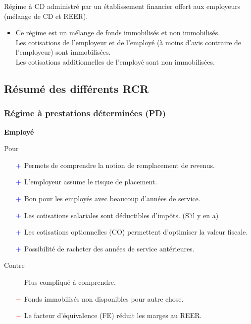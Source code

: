\documentclass[10pt, french]{article}
\begin{document}
\begin{multicols*}{3}
\begin{definitionNOHFILL}
Régime à CD administré par un établissement financier offert aux employeurs (mélange de CD et REER).

\begin{itemize}[leftmargin = *]
	\item	Ce régime est un mélange de fonds immobilisés et non immobilisés. \\
			Les cotisations de l'employeur et de l'employé (à moins d’avis contraire de l’employeur) sont immobilisées. \\
			Les cotisations additionnelles de l'employé sont non immobilisées.
\end{itemize}
\end{definitionNOHFILL}

\columnbreak

\subsection*{Résumé des différents RCR}

\subsubsection*{Régime à prestations déterminées (PD)}
\begin{center}
	\textbf{Employé}
\end{center}
Pour
\begin{itemize}
	\item[$\color{blue}+$]	Permets de comprendre la notion de remplacement de revenus.
	\item[$\color{blue}+$]	L'employeur assume le risque de placement.
	\item[$\color{blue}+$]	Bon pour les employés avec beaucoup d'années de service.
	\item[$\color{blue}+$]	Les cotisations salariales sont déductibles d'impôts. (S'il y en a)
	\item[$\color{blue}+$]	Les cotisations optionnelles (CO) permettent d'optimiser la valeur fiscale.
	\item[$\color{blue}+$]	Possibilité de racheter des années de service antérieures.
\end{itemize}

Contre
\begin{itemize}
	\item[$\color{red}-$]	Plus compliqué à comprendre.
	\item[$\color{red}-$]	Fonds immobilisés non disponibles pour autre chose.
	\item[$\color{red}-$]	Le facteur d'équivalence (FE) réduit les marges au REER.
\end{itemize}


\end{multicols*}
\end{document}

